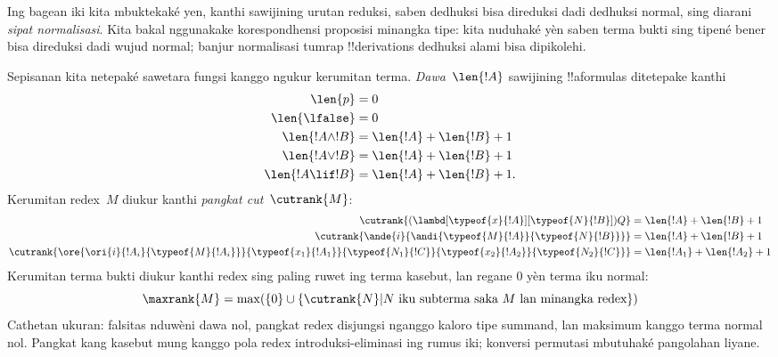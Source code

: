 \documentclass[../../../include/open-logic-section]{subfiles}
\begin{document}


Ing bagean iki kita mbuktekaké yen, kanthi sawijining urutan reduksi,
saben dedhuksi bisa direduksi dadi dedhuksi normal, sing diarani
\emph{sipat normalisasi}. Kita bakal nggunakake korespondhensi
proposisi minangka tipe: kita nuduhaké yèn saben terma bukti sing tipené bener bisa
direduksi dadi wujud normal; banjur normalisasi tumrap
!!{derivation}s dedhuksi alami bisa dipikolehi.

Sepisanan kita netepaké sawetara fungsi kanggo ngukur kerumitan terma.
\emph{Dawa}~$\len{!A}$ sawijining !!a{formula}s ditetepake kanthi
\begin{align*}
  \len{p} &= 0\\
  \len{\lfalse} &= 0\\
  \len{!A \land !B} &= \len{!A} + \len{!B} + 1\\
  \len{!A \lor !B} &= \len{!A} + \len{!B} + 1 \\
  \len{!A \lif !B} &= \len{!A} + \len{!B} + 1.
\end{align*}
Kerumitan redex~$M$ diukur kanthi \emph{pangkat
  cut}~$\cutrank{M}$:
\begin{align*}
  \cutrank{(\lambd[\typeof{x}{!A}][\typeof{N}{!B}])Q} &=
  \len{!A} + \len{!B} + 1 \\
  \cutrank{\ande{i}{\andi{\typeof{M}{!A}}{\typeof{N}{!B}}}} &=
  \len{!A} + \len{!B} + 1 \\
  \cutrank{\ore{\ori{i}{!A_{i}}{\typeof{M}{!A_i}}}
    {\typeof{x_1}{!A_1}}{\typeof{N_1}{!C}}
    {\typeof{x_2}{!A_2}}{\typeof{N_2}{!C}}} &=
  \len{!A_1} + \len{!A_2} + 1
\end{align*}
Kerumitan terma bukti diukur kanthi redex sing paling ruwet ing terma
kasebut, lan regane $0$ yèn terma iku normal:
\[
  \maxrank{M} = \max (\{0\} \cup \{\cutrank{N} | N \text{ iku subterma saka } M \text{
    lan minangka redex}\})
\]
Cathetan ukuran: falsitas nduwèni dawa nol, pangkat redex disjungsi nganggo kaloro tipe summand, lan maksimum kanggo terma normal nol. Pangkat kang kasebut mung kanggo pola redex introduksi-eliminasi ing rumus iki; konversi permutasi mbutuhaké pangolahan liyane.
\end{document}
